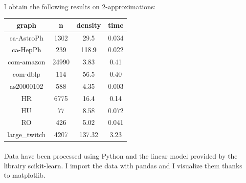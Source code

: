 \documentclass[english]{article}
\begin{document}
\begin{multicols}{2}
\paragraph{}
I obtain the following results on 2-approximations:
\newline\newline
\begin{tabular}{|c|c|c|c|}
\hline
\rowcolor{yellow} \bf graph & \bf n & \bf density & \bf time \\
\hline
ca-AstroPh & 1302 & 29.5 & 0.034 \\
\hline
ca-HepPh & 239 & 118.9 & 0.022 \\
\hline
com-amazon & 24990 & 3.83 & 0.41
\\
\hline
com-dblp & 114 & 56.5 & 0.40 \\
\hline
as20000102 & 588 & 4.35 & 0.003 \\
\hline
HR & 6775 & 16.4 & 0.14
\\
\hline
HU & 77 & 8.58 & 0.072 \\
\hline
RO & 426 & 5.02 & 0.041 \\
\hline
large\_twitch &	4207 & 137.32 &	3.23 \\
\hline	
\end{tabular}
\newline
\paragraph{}
Data have been processed using Python and the linear model provided by the librairy scikit-learn.
I import the data with pandas and I visualize them thanks to matplotlib.

\end{multicols}
\end{document}
